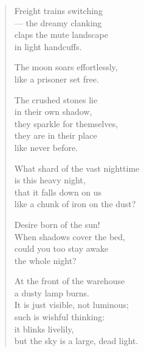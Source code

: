 \documentclass[11pt]{extbook}
\newcommand*{\centeredornament}{\centerline{\pgfornament[width=6cm]{88}}}
\begin{document}



\begin{verse}
  Freight trains switching \\
  --- the dreamy clanking \\
  claps the mute landscape \\
  in light handcuffs.

  The moon soars effortlessly, \\
  like a prisoner set free.

  The crushed stones lie \\
  in their own shadow, \\
  they sparkle for themselves, \\
  they are in their place \\
  like never before.

  What shard of the vast nighttime \\
  is this heavy night, \\
  that it falls down on us \\
  like a chunk of iron on the dust?

  Desire born of the sun! \\
  When shadows cover the bed, \\
  could you too stay awake \\
  the whole night?

  At the front of the warehouse \\
  a dusty lamp burns. \\
  It is just visible, not luminous; \\
  such is wishful thinking: \\
  it blinks livelily, \\
  but the sky is a large, dead light.
\end{verse}

\newpage

\vspace*{-15mm}
\centeredornament


\end{document}

